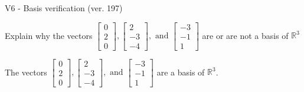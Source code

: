\begin{exercise}
  \begin{exerciseTitle}V6 - Basis verification (ver. 197)\end{exerciseTitle}
  \begin{exerciseStatement}
    Explain why the vectors \(\left[\begin{array}{r}
0 \\
2 \\
0
\end{array}\right] , \left[\begin{array}{r}
2 \\
-3 \\
-4
\end{array}\right] , \text{ and } \left[\begin{array}{r}
-3 \\
-1 \\
1
\end{array}\right]\) are or are not a basis of \(\mathbb{R}^3\)	


  \end{exerciseStatement}
  \begin{exerciseAnswer}
   The vectors \(\left[\begin{array}{r}
0 \\
2 \\
0
\end{array}\right] , \left[\begin{array}{r}
2 \\
-3 \\
-4
\end{array}\right] , \text{ and } \left[\begin{array}{r}
-3 \\
-1 \\
1
\end{array}\right]\) 
  	 are  a basis of \(\mathbb{R}^3\).
  


  \end{exerciseAnswer}
\end{exercise}